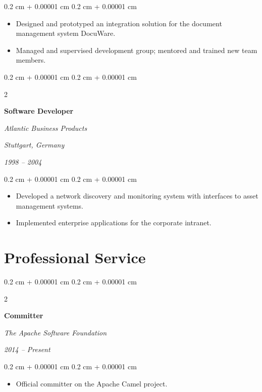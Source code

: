 \documentclass[10pt, a4paper]{article}
\newenvironment{highlights}{
    \begin{itemize}[
        topsep=0.10 cm,
        parsep=0.10 cm,
        partopsep=0pt,
        itemsep=0pt,
        leftmargin=0.4 cm + 10pt
    ]
}{
    \end{itemize}
} %
\newenvironment{onecolentry}{
    \begin{adjustwidth}{
        0.2 cm + 0.00001 cm
    }{
        0.2 cm + 0.00001 cm
    }
}{
    \end{adjustwidth}
} %
\newenvironment{twocolentry}[2][]{
    \onecolentry
    \def\secondColumn{#2}
    \setcolumnwidth{\fill, 8 cm}
    \begin{paracol}{2}
}{
    \switchcolumn \raggedleft \secondColumn
    \end{paracol}
    \endonecolentry
} %
\begin{document}
\vspace{0.10 cm}
\begin{onecolentry}
    \begin{highlights}
        \item Designed and prototyped an integration solution for the document management system DocuWare.
        \item Managed and supervised development group; mentored and trained new team members.
    \end{highlights}
\end{onecolentry}

\vspace{0.20 cm}



%
%
\begin{twocolentry}{
        \textit{Stuttgart, Germany}

        \textit{1998 – 2004}}
    \textbf{Software Developer}

    \textit{Atlantic Business Products}
\end{twocolentry}

\vspace{0.10 cm}
\begin{onecolentry}
    \begin{highlights}
        \item Developed a network discovery and monitoring system with interfaces to asset management systems.
        \item Implemented enterprise applications for the corporate intranet.
    \end{highlights}
\end{onecolentry}

\vspace{0.20 cm}



\section{Professional Service}
\begin{twocolentry}{
        \textit{2014 – Present}}
    \textbf{Committer}

    \textit{The Apache Software Foundation}
\end{twocolentry}

\vspace{0.10 cm}
\begin{onecolentry}
    \begin{highlights}
        \item Official committer on the Apache Camel project.
    \end{highlights}
\end{onecolentry}
\end{document}
